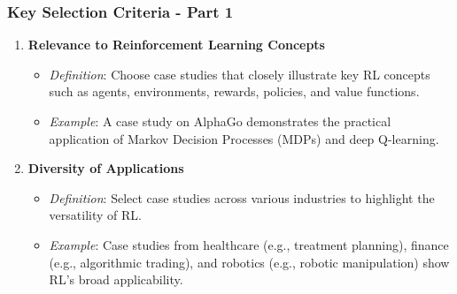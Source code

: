 \documentclass[aspectratio=169]{beamer}
\begin{document}
\begin{frame}[fragile]
    \frametitle{Key Selection Criteria - Part 1}
    \begin{enumerate}
        \item \textbf{Relevance to Reinforcement Learning Concepts}
            \begin{itemize}
                \item \textit{Definition}: Choose case studies that closely illustrate key RL concepts such as agents, environments, rewards, policies, and value functions.
                \item \textit{Example}: A case study on AlphaGo demonstrates the practical application of Markov Decision Processes (MDPs) and deep Q-learning.
            \end{itemize}
        
        \item \textbf{Diversity of Applications}
            \begin{itemize}
                \item \textit{Definition}: Select case studies across various industries to highlight the versatility of RL.
                \item \textit{Example}: Case studies from healthcare (e.g., treatment planning), finance (e.g., algorithmic trading), and robotics (e.g., robotic manipulation) show RL's broad applicability.
            \end{itemize}
    \end{enumerate}
\end{frame}
\end{document}
